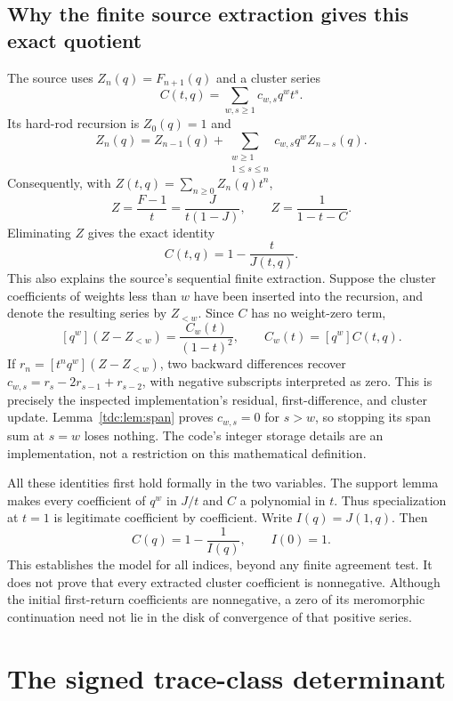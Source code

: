 \documentclass[11pt]{article}
\theoremstyle{definition}\newtheorem{definition}[theorem]{Definition}
\theoremstyle{remark}\newtheorem{remark}[theorem]{Remark}
\begin{document}
\subsection{Why the finite source extraction gives this exact quotient}
The source uses $Z_n(q)=F_{n+1}(q)$ and a cluster series
\[
 C(t,q)=\sum_{w,s\ge1}c_{w,s}q^w t^s.
\]
Its hard-rod recursion is $Z_0(q)=1$ and
\[
 Z_n(q)=Z_{n-1}(q)+\sum_{\substack{w\ge1\\1\le s\le n}}
 c_{w,s}q^w Z_{n-s}(q).
\]
Consequently, with $Z(t,q)=\sum_{n\ge0}Z_n(q)t^n$,
\[
 Z=\frac{F-1}{t}=\frac{J}{t(1-J)},\qquad
 Z=\frac1{1-t-C}.
\]
Eliminating $Z$ gives the exact identity
\begin{equation}\label{tdc:eq:sourcequotient}
 C(t,q)=1-\frac{t}{J(t,q)}.
\end{equation}
This also explains the source's sequential finite extraction. Suppose the cluster coefficients of weights less than $w$ have been inserted into the recursion, and denote the resulting series by $Z_{<w}$. Since $C$ has no weight-zero term,
\[
 [q^w](Z-Z_{<w})=\frac{C_w(t)}{(1-t)^2},\qquad
 C_w(t)=[q^w]C(t,q).
\]
If $r_n=[t^nq^w](Z-Z_{<w})$, two backward differences recover
$c_{w,s}=r_s-2r_{s-1}+r_{s-2}$, with negative subscripts interpreted as zero. This is precisely the inspected implementation's residual, first-difference, and cluster update. Lemma~\ref{tdc:lem:span} proves $c_{w,s}=0$ for $s>w$, so stopping its span sum at $s=w$ loses nothing. The code's integer storage details are an implementation, not a restriction on this mathematical definition.

All these identities first hold formally in the two variables. The support lemma makes every coefficient of $q^w$ in $J/t$ and $C$ a polynomial in $t$. Thus specialization at $t=1$ is legitimate coefficient by coefficient. Write $I(q)=J(1,q)$. Then
\begin{equation}\label{tdc:eq:CfromI}
 C(q)=1-\frac1{I(q)},\qquad I(0)=1.
\end{equation}
This establishes the model for all indices, beyond any finite agreement test. It does not prove that every extracted cluster coefficient is nonnegative. Although the initial first-return coefficients are nonnegative, a zero of its meromorphic continuation need not lie in the disk of convergence of that positive series.

\section{The signed trace-class determinant}
\label{tdc:sec:operator}
\end{document}
